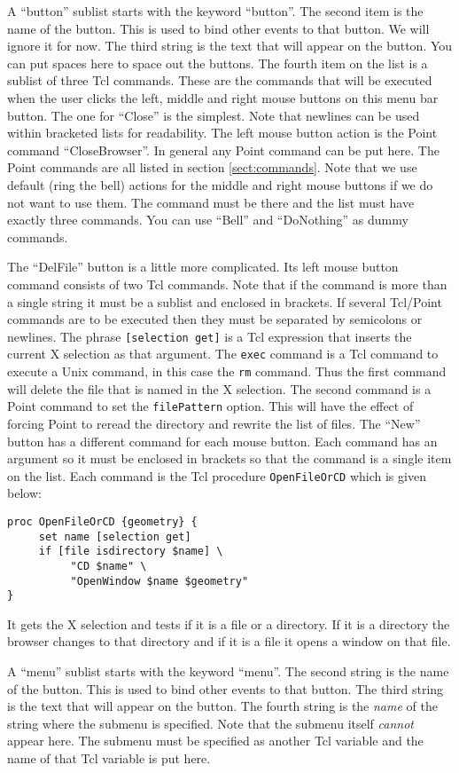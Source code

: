 A ``button'' sublist starts with the keyword ``button''.
The second item is the name of the button.
This is used to bind other events to that button.
We will ignore it for now.
The third string is the text that will appear on the button.
You can put spaces here to space out the buttons.
The fourth item on the list is a sublist of three Tcl commands.
These are the commands that will be executed when the user clicks
the left, middle and right mouse buttons on this menu bar button.
The one for ``Close'' is the simplest.
Note that newlines can be used within bracketed lists for readability.
The left mouse button action is the Point command ``CloseBrowser''.
In general any Point command can be put here.
The Point commands are all listed in section \ref{sect:commands}.
Note that we use default (ring the bell) actions for the middle
and right mouse buttons if we do not want to use them.
The command must be there and the list must have exactly three commands.
You can use ``Bell'' and ``DoNothing'' as dummy commands.

The ``DelFile'' button is a little more complicated.
Its left mouse button command consists of two Tcl commands.
Note that if the command is more than a single string it
must be a sublist and enclosed in brackets.
If several Tcl/Point commands are to be executed then they
must be separated by semicolons or newlines.
The phrase {\tt [selection get]} is a Tcl expression that inserts
the current X selection as that argument.
The {\tt exec} command is a Tcl command to execute a Unix command,
in this case the {\tt rm} command.
Thus the first command will delete the file that is named in the
X selection.
The second command is a Point command to set the {\tt filePattern} option.
This will have the effect of forcing Point to reread the directory and
rewrite the list of files.
The ``New'' button has a different command for each mouse button.
Each command has an argument so it must be enclosed in brackets
so that the command is a single item on the list.
Each command is the Tcl procedure {\tt OpenFileOrCD} which is given below:
\begin{verbatim}
proc OpenFileOrCD {geometry} {
     set name [selection get]
     if [file isdirectory $name] \
          "CD $name" \
          "OpenWindow $name $geometry"
}
\end{verbatim}
It gets the X selection and tests if it is a file or a directory.
If it is a directory the browser changes to that directory and if it is a file
it opens a window on that file.

A ``menu'' sublist starts with the keyword ``menu''.
The second string is the name of the button.
This is used to bind other events to that button.
The third string is the text that will appear on the button.
The fourth string is the {\it name} of the string where
the submenu is specified.
Note that the submenu itself {\it cannot} appear here.
The submenu must be specified as another Tcl variable and
the name of that Tcl variable is put here.


